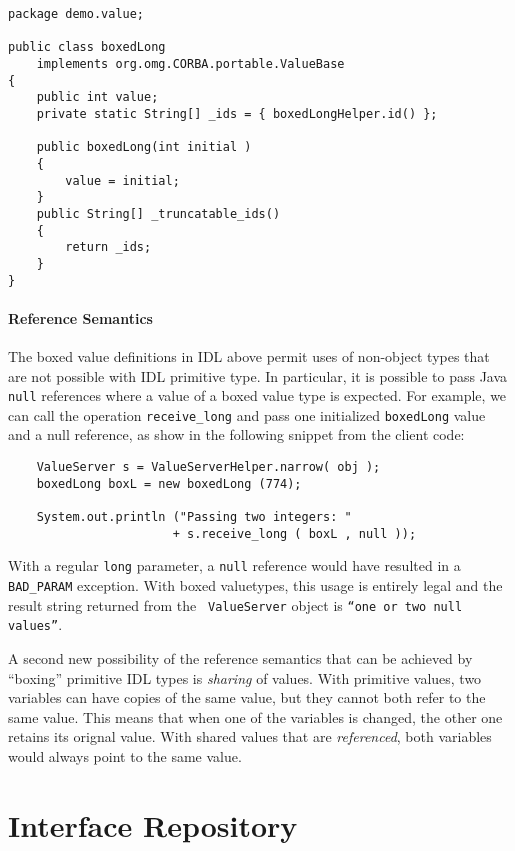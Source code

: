 \documentclass[12pt]{scrbook}
\begin{document}
\begin{verbatim}
package demo.value;

public class boxedLong
    implements org.omg.CORBA.portable.ValueBase
{
    public int value;
    private static String[] _ids = { boxedLongHelper.id() };

    public boxedLong(int initial )
    {
        value = initial;
    }
    public String[] _truncatable_ids()
    {
        return _ids;
    }
}
\end{verbatim}

\subsubsection{Reference Semantics}

The boxed value definitions in IDL above permit uses of non-object
types that are not possible with IDL primitive type. In particular, it
is possible to pass Java {\tt null} references where a value of a
boxed value type is expected. For example, we can call the operation
{\tt receive\_long} and pass one initialized {\tt boxedLong} value and
a null reference, as show in the following snippet from the client
code:

\begin{verbatim}
    ValueServer s = ValueServerHelper.narrow( obj );
    boxedLong boxL = new boxedLong (774);

    System.out.println ("Passing two integers: " 
                       + s.receive_long ( boxL , null ));
\end{verbatim}

With a regular {\tt long} parameter, a {\tt null} reference would have
resulted in a {\tt BAD\_PARAM} exception. With boxed valuetypes, this
usage is entirely legal and the result string returned from the {\tt
  ValueServer} object is {\tt ``one or two null values''}.

A second new possibility of the reference semantics that can be
achieved by ``boxing'' primitive IDL types is {\em sharing} of values.
With primitive values, two variables can have copies of the same
value, but they cannot both refer to the same value. This means that
when one of the variables is changed, the other one retains its
orignal value. With shared values that are {\em referenced}, both
variables would always point to the same value.


\chapter{Interface Repository}
\label{ch:interface_repository}
\end{document}

